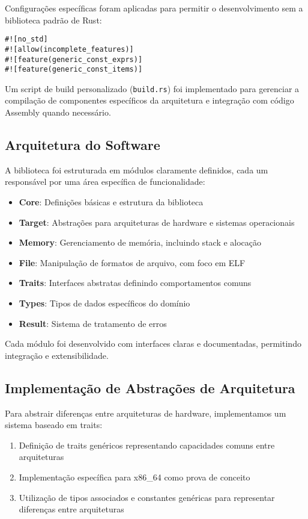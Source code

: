 \documentclass[12pt,a4paper]{article}
\begin{document}
Configurações específicas foram aplicadas para permitir o desenvolvimento sem a biblioteca padrão de Rust:

\begin{lstlisting}
#![no_std]
#![allow(incomplete_features)]
#![feature(generic_const_exprs)]
#![feature(generic_const_items)]
\end{lstlisting}

Um script de build personalizado (\texttt{build.rs}) foi implementado para gerenciar a compilação de componentes específicos da arquitetura e integração com código Assembly quando necessário.

\subsection{Arquitetura do Software}

A biblioteca foi estruturada em módulos claramente definidos, cada um responsável por uma área específica de funcionalidade:

\begin{itemize}
    \item \textbf{Core}: Definições básicas e estrutura da biblioteca
    \item \textbf{Target}: Abstrações para arquiteturas de hardware e sistemas operacionais
    \item \textbf{Memory}: Gerenciamento de memória, incluindo stack e alocação
    \item \textbf{File}: Manipulação de formatos de arquivo, com foco em ELF
    \item \textbf{Traits}: Interfaces abstratas definindo comportamentos comuns
    \item \textbf{Types}: Tipos de dados específicos do domínio
    \item \textbf{Result}: Sistema de tratamento de erros
\end{itemize}

Cada módulo foi desenvolvido com interfaces claras e documentadas, permitindo integração e extensibilidade.

\subsection{Implementação de Abstrações de Arquitetura}

Para abstrair diferenças entre arquiteturas de hardware, implementamos um sistema baseado em traits:

\begin{enumerate}
    \item Definição de traits genéricos representando capacidades comuns entre arquiteturas
    \item Implementação específica para x86\_64 como prova de conceito
    \item Utilização de tipos associados e constantes genéricas para representar diferenças entre arquiteturas
\end{enumerate}
\end{document}

